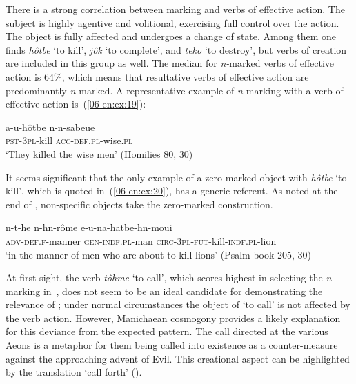 \documentclass[output=paper]{LSP/langsci}
\begin{document}
There is a strong correlation between marking and verbs of effective action. The subject is highly agentive and volitional, exercising full control over the action. The object is fully affected and undergoes a change of state. Among them one finds \textit{hôtbe} ‘to kill’, \textit{jôk} ‘to complete’, and \textit{teko} ‘to destroy’, but verbs of creation are included in this group as well. The median for \textit{n-}marked verbs of effective action is 64\%, which means that resultative verbs of effective action are predominantly \textit{n-}marked. A representative example of \textit{n-}marking with a verb of effective action is~(\ref{06-en:ex:19}):

\begin{exe}
\ex \label{06-en:ex:19}
\gll a-u-hôtbe 		n-n-sabeue\\
	\textsc{pst-}\textsc{3pl-}kill \textsc{acc-}\textsc{def.pl-}wise.\textsc{pl}\\
\glt ‘They killed the wise men’ (Homilies 80, 30)
\end{exe}

It seems significant that the only example of a zero-marked object with \textit{hôtbe} ‘to kill’, which is quoted in~(\ref{06-en:ex:20}), has a generic referent. As noted at the end of , non-specific objects take the zero-marked construction.

\begin{exe}
\ex \label{06-en:ex:20}
\gll n-t-he 					n-hn-rôme 		e-u-na-hatbe-hn-moui\\
	\textsc{adv-}\textsc{def.f-}manner \textsc{gen-indf.pl-}man \textsc{circ-3pl-fut-}kill-\textsc{indf.pl-}lion\\
\glt ‘in the manner of men who are about to kill lions’ (Psalm-book 205, 30) 
\end{exe}

At first sight, the verb\textit{ tôhme} ‘to call’, which scores highest in selecting the \textit{n-}marking in~, does not seem to be an ideal candidate for demonstrating the relevance of ; under normal circumstances the object of ‘to call’ is not affected by the verb action. However, Manichaean cosmogony provides a likely explanation for this deviance from the expected pattern. The call directed at the various Aeons is a metaphor for them being called into existence as a counter-measure against the approaching advent of Evil. This creational aspect can be highlighted by the translation ‘call forth’ (\cf \citealt{Kasser1991Premier}). 
\end{document}
